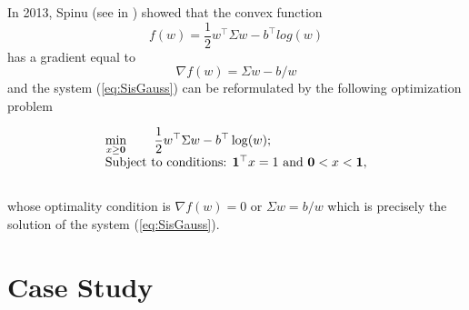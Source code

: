 In 2013, Spinu (see in \cite{Spinu2013}) showed that the convex function
\[
f(w)= \frac{1}{2}w^\top \Sigma w - b^\top log(w)
\]
has a gradient equal to
\[
\nabla f(w) = \Sigma w - b/w
\]
and the system (\ref{eq:SisGauss}) can be reformulated by the following optimization problem

\begin{equation}\label{eq:GaussProb}
\begin{array}{l}
\displaystyle\min_{x\geq {\bf 0}}\qquad \frac{1}{2}w^\top \Sigma w - b^\top \log(w); \\
\vspace{0.5cm}
\mbox{Subject to conditions: } {\bf 1}^\top x =1 \mbox{ and } {\bf 0}<x<{\bf 1},
\end{array}
\end{equation}
whose optimality condition is $\nabla f(w) = 0$ or $\Sigma w = b/w$ which is precisely the solution of the system (\ref{eq:SisGauss}).

















































\section{Case Study}